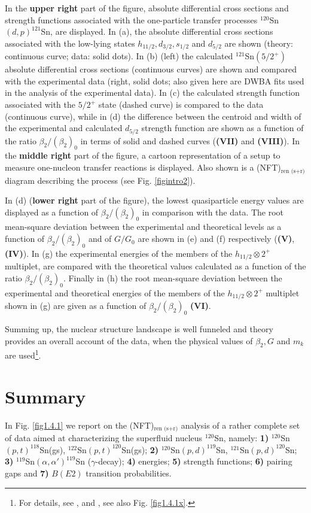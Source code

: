    In the  \textbf{upper right} part of the figure, absolute differential cross sections and strength functions associated with the one-particle transfer processes $^{120}$Sn$(d,p)^{121}$Sn, are displayed. In  (a), the absolute differential cross sections associated with the low-lying  states $h_{11/2},d_{3/2},s_{1/2}$ and $d_{5/2}$ are shown (theory: continuous curve; data: solid dots). In (b) (left) the calculated $^{121}$Sn$(5/2^+)$ absolute differential cross sections (continuous curves) are shown and compared with the experimental data (right, solid dots; also given here are DWBA fits used in the analysis of the experimental data). In (c)  the calculated strength function associated with the $5/2^+$ state (dashed curve) is compared to the data (continuous curve), while in  (d) the difference between the centroid and  width of the experimental and calculated $d_{5/2}$ strength function  are shown as a function of the ratio $\beta_2/(\beta_2)_0$ in terms of  solid and dashed curves (\textbf{(VII)} and \textbf{(VIII)}).
    In the \textbf{middle right} part of the figure, a cartoon representation of a setup to measure one-nucleon transfer reactions is displayed. Also shown is a (NFT)$_{\text{ren (s+r)}}$ diagram  describing the process (see Fig. \ref{figintro2}).
    
    
      In (d)  (\textbf{lower right} part of the figure), the lowest quasiparticle energy values are displayed as a function of $\beta_2/(\beta_2)_0$ in comparison with the data.  The root mean-square deviation between the experimental and theoretical levels as a function  of  $\beta_2/(\beta_2)_0$ and  of $G/G_0$ are shown in (e) and (f) respectively (\textbf{(V)}, \textbf{(IV)}). In (g) the  experimental energies of the members of the $h_{11/2}\otimes 2^+$  multiplet, are compared with the theoretical values calculated as a function of the ratio $\beta_2/(\beta_2)_0$. Finally in (h) the root mean-square deviation between the experimental and theoretical energies of the members of the $h_{11/2}\otimes 2^+$ multiplet shown in (g) are given as a function of $\beta_2/(\beta_2)_0$ \textbf{(VI)}. 
  
  
  Summing up, the nuclear structure landscape is well funneled and  theory provides an overall account of the data, when the physical values of $\beta_2,G$ and $m_k$ are used\footnote{For details, see \cite{Idini:15}, and \cite{Broglia:16}, see also  Fig. \ref{fig1.4.1x}.}.

\section{Summary}\label{C1S11}
In Fig. \ref{fig1.4.1} we report on the (NFT)$_{\text{ren (s+r)}}$ analysis of a rather complete set of data aimed at characterizing the superfluid nucleus $^{120}$Sn, namely: \textbf{1)} $^{120}$Sn$(p,t)^{118}$Sn(gs), $^{122}$Sn$(p,t)^{120}$Sn(gs); \textbf{2)} $^{120}$Sn$(p,d)^{119}$Sn, $^{121}$Sn$(p,d)^{120}$Sn; \textbf{3)} $^{119}$Sn$(\alpha,\alpha')^{119}$Sn ($\gamma$-decay); \textbf{4)} energies; \textbf{5)} strength functions; \textbf{6)} pairing gaps and \textbf{7)} $B(E2)$ transition probabilities.

